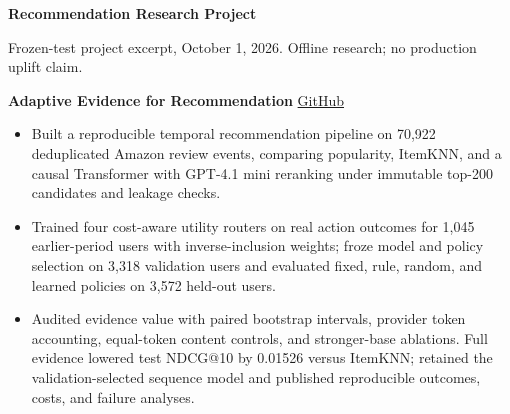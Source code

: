 \documentclass[11pt]{article}
\begin{document}
{\Large\bfseries Recommendation Research Project}\par
\vspace{0.5em}
{\small Frozen-test project excerpt, October 1, 2026. Offline research; no production uplift claim.}\par
\vspace{1.2em}
\noindent\textbf{Adaptive Evidence for Recommendation}
\hfill\href{https://github.com/WItaZhang/agentic-rec}{GitHub}
\begin{itemize}
  \item Built a reproducible temporal recommendation pipeline on 70,922 deduplicated Amazon review events, comparing popularity, ItemKNN, and a causal Transformer with GPT-4.1 mini reranking under immutable top-200 candidates and leakage checks.
  \item Trained four cost-aware utility routers on real action outcomes for 1,045 earlier-period users with inverse-inclusion weights; froze model and policy selection on 3,318 validation users and evaluated fixed, rule, random, and learned policies on 3,572 held-out users.
  \item Audited evidence value with paired bootstrap intervals, provider token accounting, equal-token content controls, and stronger-base ablations. Full evidence lowered test NDCG@10 by 0.01526 versus ItemKNN; retained the validation-selected sequence model and published reproducible outcomes, costs, and failure analyses.
\end{itemize}
\end{document}

